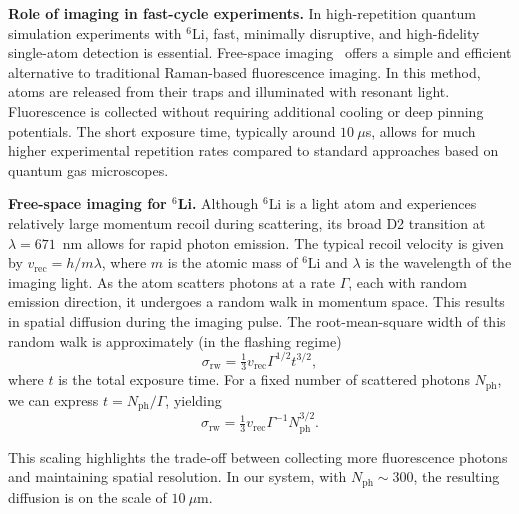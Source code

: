 
\textbf{Role of imaging in fast-cycle experiments.}  
In high-repetition quantum simulation experiments with ${}^6$Li, fast, minimally disruptive, and high-fidelity single-atom detection is essential. Free-space imaging~\cite{bergschneider_spin-resolved_2018,su_fast_2025} offers a simple and efficient alternative to traditional Raman-based fluorescence imaging. In this method, atoms are released from their traps and illuminated with resonant light. Fluorescence is collected without requiring additional cooling or deep pinning potentials. The short exposure time, typically around $10~\mu$s, allows for much higher experimental repetition rates compared to standard approaches based on quantum gas microscopes.

\textbf{Free-space imaging for ${}^6$Li.}  
Although ${}^6$Li is a light atom and experiences relatively large momentum recoil during scattering, its broad D2 transition at $\lambda = 671$~nm allows for rapid photon emission. The typical recoil velocity is given by $v_\mathrm{rec} = {h}/{m \lambda}$, where $m$ is the atomic mass of ${}^6$Li and $\lambda$ is the wavelength of the imaging light. As the atom scatters photons at a rate $\Gamma$, each with random emission direction, it undergoes a random walk in momentum space. This results in spatial diffusion during the imaging pulse. The root-mean-square width of this random walk is approximately \cite{kruip_design_2024} (in the flashing regime)
\begin{equation}
	\sigma_\mathrm{rw} = \tfrac{1}{3} v_\mathrm{rec} \Gamma^{1/2} t^{3/2},
	\label{eq:sigmarw}
\end{equation}
where $t$ is the total exposure time. For a fixed number of scattered photons $N_\mathrm{ph}$, we can express $t = N_\mathrm{ph} / \Gamma$, yielding
\begin{equation}
	\sigma_\mathrm{rw} = \tfrac{1}{3} v_\mathrm{rec} \Gamma^{-1} N_\mathrm{ph}^{3/2}.
\end{equation}

This scaling highlights the trade-off between collecting more fluorescence photons and maintaining spatial resolution. In our system, with $N_\mathrm{ph} \sim 300$, the resulting diffusion is on the scale of $10~\mu$m.



